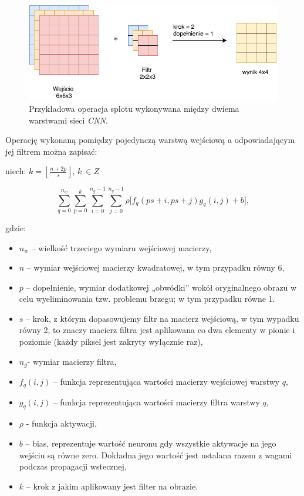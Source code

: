 \begin{figure}[ht]
\centerline{\includegraphics[scale=0.8]{resources/cnn/splot_w_cnn.pdf}}
\caption{Przykładowa operacja splotu wykonywana między dwiema warstwami sieci \textit{CNN}.}
\label{fig:splot}
\end{figure}

Operację wykonaną pomiędzy pojedynczą warstwą wejściową a odpowiadającym jej filtrem można zapisać:

niech: \(k = \left\lfloor \frac{n + 2p}{s} \right\rfloor\), \(k\ \in Z\)

\[\sum_{q = 0}^{n_{w}}{\sum_{p = 0}^{k}{\sum_{i = 0}^{n_{g} - 1}{\sum_{j = 0}^{n_{g} - 1}{\rho\lbrack f_{q}\left( ps + i,ps + j \right) g_{q}\left( i,j \right) + b\rbrack}}}},\]

gdzie:

\begin{itemize}
\item
  \(n_{w}\) -- wielkość trzeciego wymiaru wejściowej macierzy,
\item
  \(n\) -- wymiar wejściowej macierzy kwadratowej, w tym przypadku równy 6,
\item
  \(p\) -- dopełnienie, wymiar dodatkowej „obwódki'' wokół oryginalnego
  obrazu w celu wyeliminowania tzw. problemu brzegu; w tym przypadku
  równe 1.
\item
  \(s\) -- krok, z którym dopasowujemy filtr na macierz wejściową, w tym
  wypadku równy 2, to znaczy macierz filtra jest aplikowana co dwa
  elementy w pionie i poziomie (każdy piksel jest zakryty wyłącznie
  raz),
\item
  \(n_{g}\)- wymiar macierzy filtra,
\item
  \(f_{q}(i,j)\) -- funkcja reprezentująca wartości macierzy wejściowej
  warstwy \(q\),
\item
  \(g_{q}(i,j)\) -- funkcja reprezentująca wartości macierzy filtra
  warstwy \(q\),
\item
  \(\rho\) - funkcja aktywacji,
\item
  \(b\) -- bias, reprezentuje wartość neuronu gdy wszystkie aktywacje na jego wejściu są równe zero. Dokładna jego wartość jest ustalana razem z wagami podczas propagacji wstecznej,
\item
  \(k\) -- krok z jakim aplikowany jest filter na obrazie.
\end{itemize}


